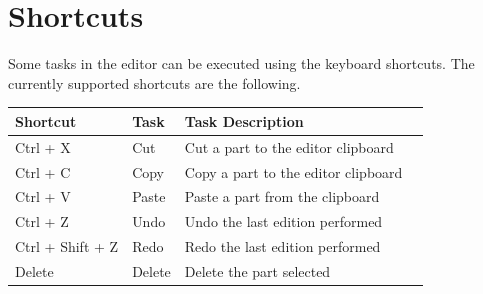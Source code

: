 \documentclass[a4paper]{profusion}
\begin{document}
\section{Shortcuts}

Some tasks in the editor can be executed using the keyboard shortcuts.
The currently supported shortcuts are the following.

\begin{center}
    \begin{tabular}{ | l | l | l | p{5cm} |}
    \hline
    Shortcut & Task & Task Description \\ \hline
    Ctrl + X & Cut & Cut a part to the editor clipboard \\ \hline
    Ctrl + C & Copy & Copy a part to the editor clipboard \\ \hline
    Ctrl + V & Paste & Paste a part from the clipboard \\ \hline
    Ctrl + Z & Undo & Undo the last edition performed \\ \hline
    Ctrl + Shift + Z & Redo & Redo the last edition performed \\ \hline
    Delete & Delete & Delete the part selected \\
    \hline
    \end{tabular}
\end{center}
\end{document}
